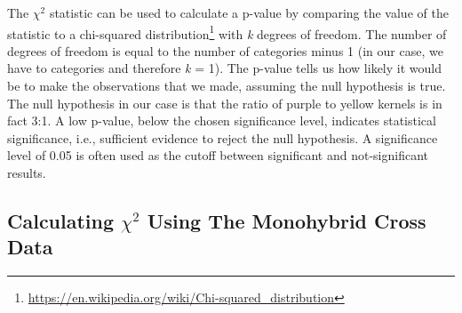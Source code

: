 \documentclass[]{book}
\let\rmarkdownfootnote\footnote%
\def\footnote{\protect\rmarkdownfootnote}
\renewcommand{\href}[2]{#2\footnote{\url{#1}}}
\begin{document}
The \(\chi^2\) statistic can be used to calculate a p-value by comparing the value of the statistic to a \href{https://en.wikipedia.org/wiki/Chi-squared_distribution}{chi-squared distribution} with \emph{k} degrees of freedom. The number of degrees of freedom is equal to the number of categories minus 1 (in our case, we have to categories and therefore \emph{k} = 1). The p-value tells us how likely it would be to make the observations that we made, assuming the null hypothesis is true. The null hypothesis in our case is that the ratio of purple to yellow kernels is in fact 3:1. A low p-value, below the chosen significance level, indicates statistical significance, i.e., sufficient evidence to reject the null hypothesis. A significance level of 0.05 is often used as the cutoff between significant and not-significant results.

\hypertarget{calculating-chi2-using-the-monohybrid-cross-data}{%
\subsection{\texorpdfstring{Calculating \(\chi^2\) Using The Monohybrid Cross Data}{Calculating \textbackslash{}chi\^{}2 Using The Monohybrid Cross Data}}\label{calculating-chi2-using-the-monohybrid-cross-data}}
\end{document}
